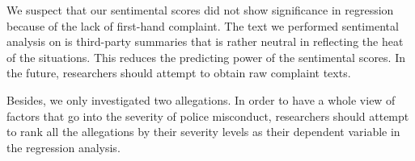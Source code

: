 \documentclass[10pt]{article}
\begin{document}
We suspect that our sentimental scores did not show significance in regression because of the lack of first-hand complaint. The text we performed sentimental analysis on is third-party summaries that is rather neutral in reflecting the heat of the situations. This reduces the predicting power of the sentimental scores. In the future, researchers should attempt to obtain raw complaint texts.

Besides, we only investigated two allegations. In order to have a whole view of factors that go into the severity of police misconduct, researchers should attempt to rank all the allegations by their severity levels as their dependent variable in the regression analysis.
\end{document}
